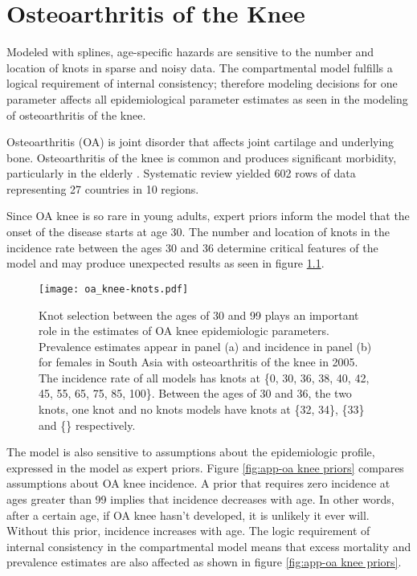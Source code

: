 \chapter{Osteoarthritis of the Knee}
\label{applications-con_fit_splines}

Modeled with splines, age-specific hazards are sensitive to the number and location of knots in sparse and noisy data.  The compartmental model fulfills a logical requirement of internal consistency; therefore modeling decisions for one parameter affects all epidemiological parameter estimates as seen in the modeling of osteoarthritis of the knee.

Osteoarthritis (OA) is joint disorder that affects joint cartilage and underlying bone. Osteoarthritis of the knee is common and produces significant morbidity, particularly in the elderly \cite{felson_epidemiology_1988, felson_incidence_1995}.  Systematic review yielded 602 rows of data representing 27 countries in 10 regions.

Since OA knee is so rare in young adults, expert priors inform the model that the onset of the disease starts at age 30.  The number and location of knots in the incidence rate between the ages 30 and 36 determine critical features of the model and may produce unexpected results as seen in figure \ref{fig:app-oa knee knots}.

    \begin{figure}[h]
        \begin{center}
            \texttt{[image: oa\_knee-knots.pdf]}
            \caption{Knot selection between the ages of 30 and 99 plays an important role in the estimates of OA knee epidemiologic parameters.  Prevalence estimates appear in panel (a) and incidence in panel (b) for females in South Asia with osteoarthritis of the knee in 2005.  The incidence rate of all models has knots at \{0, 30, 36, 38, 40, 42, 45, 55, 65, 75, 85, 100\}.  Between the ages of 30 and 36, the two knots, one knot and no knots models have knots at \{32, 34\}, \{33\} and \{\} respectively.}
            \label{fig:app-oa knee knots}
        \end{center}
    \end{figure}

The model is also sensitive to assumptions about the epidemiologic profile, expressed in the model as expert priors.  Figure \ref{fig:app-oa knee priors} compares assumptions about OA knee incidence.  A prior that requires zero incidence at ages greater than 99 implies that incidence decreases with age.  In other words, after a certain age, if OA knee hasn't developed, it is unlikely it ever will. Without this prior, incidence increases with age.  The logic requirement of internal consistency in the compartmental model means that excess mortality and prevalence estimates are also affected as shown in figure \ref{fig:app-oa knee priors}.

